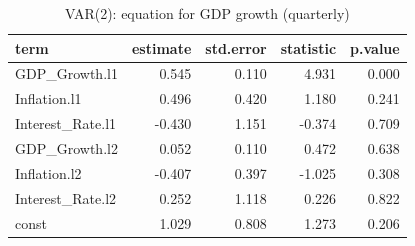 \begin{table}

\caption{\label{tab:var-summary}VAR(2): equation for GDP growth (quarterly)}
\centering
\begin{tabular}[t]{lrrrr}
\toprule
term & estimate & std.error & statistic & p.value\\
\midrule
GDP\_Growth.l1 & 0.545 & 0.110 & 4.931 & 0.000\\
Inflation.l1 & 0.496 & 0.420 & 1.180 & 0.241\\
Interest\_Rate.l1 & -0.430 & 1.151 & -0.374 & 0.709\\
GDP\_Growth.l2 & 0.052 & 0.110 & 0.472 & 0.638\\
Inflation.l2 & -0.407 & 0.397 & -1.025 & 0.308\\
\addlinespace
Interest\_Rate.l2 & 0.252 & 1.118 & 0.226 & 0.822\\
const & 1.029 & 0.808 & 1.273 & 0.206\\
\bottomrule
\end{tabular}
\end{table}
